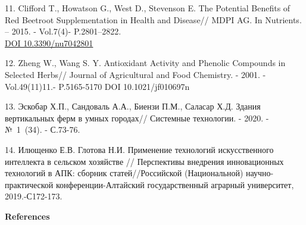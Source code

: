 \begin{references}
11. Clifford T., Howatson G., West D., Stevenson E. The Potential
Benefits of Red Beetroot Supplement\-ation in Health and Disease// MDPI
AG. In Nutrients. -- 2015. - Vol.7(4)- P.2801--2822.\\
\href{https://doi.org/10.3390/nu7042801}{DOI 10.3390/nu7042801}

12. Zheng W., Wang S. Y. Antioxidant Activity and Phenolic Compounds in
Selected Herbs// Journal of Agricultural and Food Chemistry. - 2001. -
Vol.49(11)11.- P.5165-5170 DOI 10.1021/jf010697n

13. Эскобар Х.П., Сандоваль А.А., Биензи П.М., Саласар Х.Д. Здания
вертикальных ферм в умных городах// Системные технологии. - 2020. -
№~1~(34). - С.73-76.

14. Илющенко Е.В. Глотова Н.И. Применение технологий искусственного
интеллекта в сельском хозяйстве // Перспективы внедрения инновационных
технологий в АПК: сборник статей//Российской (Национальной)
научно-практической конференции-Алтайский государственный аграрный
универ\-ситет, 2019.-С172-173.
\end{references}

\begin{center}
{\bfseries References}
\end{center}

